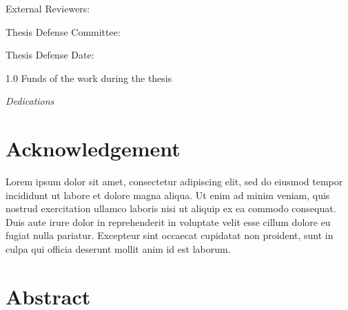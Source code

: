 \documentclass[
A4paper,                %
twoside,                %
openright,              %
chapterprefix=true,     %
12pt,                   %
headings=normal,        %
titlepage=on            %
]{book}
\begin{document}
\vspace{10 mm}
External Reviewers: 

\vspace{30 mm}

Thesis Defense Committee: 


\vspace{50mm}



Thesis Defense Date: 



\vspace{\fill}
\begin{spacing}{1.0}
Funds of the work during the thesis
\end{spacing}

\cleardoublepage

%


\vspace*{\fill}
\begin{flushright} 
    \textit{Dedications}
    \vspace{15cm}
\end{flushright}
\cleardoublepage

%
\section*{Acknowledgement}
\label{sec::acknowledgement}

Lorem ipsum dolor sit amet, consectetur adipiscing elit, sed do eiusmod tempor incididunt ut labore et dolore magna aliqua. Ut enim ad minim veniam, quis nostrud exercitation ullamco laboris nisi ut aliquip ex ea commodo consequat. Duis aute irure dolor in reprehenderit in voluptate velit esse cillum dolore eu fugiat nulla pariatur. Excepteur sint occaecat cupidatat non proident, sunt in culpa qui officia deserunt mollit anim id est laborum.
\newpage

%

\section*{Abstract}
\label{sec::abstract}
\end{document}
